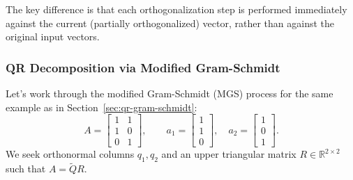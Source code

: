 \documentclass[../../main.tex]{subfiles}
\begin{document}
The key difference is that each orthogonalization step is performed immediately against the current (partially orthogonalized) vector, rather than against the original input vectors.

\subsubsection{QR Decomposition via Modified Gram-Schmidt}

Let's work through the modified Gram-Schmidt (MGS) process for the same example as in Section~\ref{sec:qr-gram-schmidt}:
\[
    A = \begin{bmatrix} 1 & 1 \\ 1 & 0 \\ 0 & 1 \end{bmatrix},
    \qquad a_1 = \begin{bmatrix} 1 \\ 1 \\ 0 \end{bmatrix},\quad a_2 = \begin{bmatrix} 1 \\ 0 \\ 1 \end{bmatrix}.
\]
We seek orthonormal columns $q_1, q_2$ and an upper triangular matrix $R \in \mathbb{R}^{2 \times 2}$ such that $A = \widetilde{Q} R$.
\end{document}
